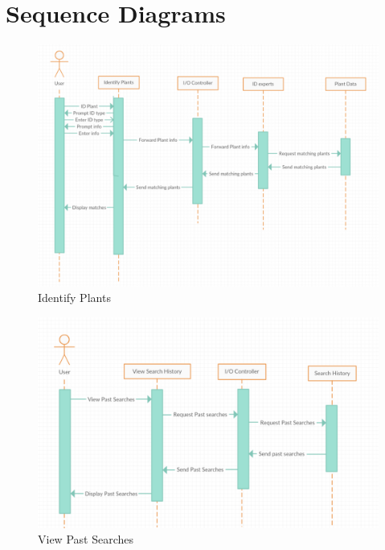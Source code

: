\documentclass[]{article}
\begin{document}
\section{Sequence Diagrams}
\label{sec:sequence_diagrams}
\begin{figure}[h!]
\centering
\includegraphics[scale=0.6]{IdentifyPlants.png}
\caption{Identify Plants}
\label{fig:s1}
\end{figure}

\begin{figure}[h!]
\centering
\includegraphics[scale=0.6]{ViewPastSearches.png}
\caption{View Past Searches}
\label{fig:s2}
\end{figure}
\end{document}
